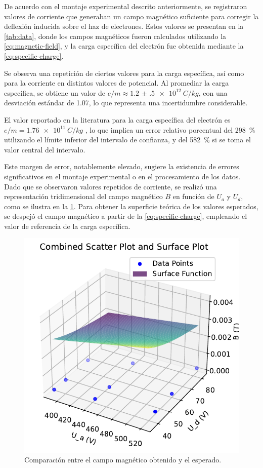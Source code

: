 De acuerdo con el montaje experimental descrito anteriormente,
se registraron valores de corriente que generaban un campo magnético suficiente
para corregir la deflexión inducida sobre el haz de electrones.
Estos valores se presentan en la \cref{tab:data}, donde los campos magnéticos
fueron calculados utilizando la \cref{eq:magnetic-field}, y la carga específica
del electrón fue obtenida mediante la \cref{eq:specific-charge}.



Se observa una repetición de ciertos valores para la carga específica,
así como para la corriente en distintos valores de potencial.
Al promediar la carga específica,
se obtiene un valor de \(e / m \approx \qty{1.2(5)e+12}{C \per kg}\),
con una desviación estándar de \num{1.07}, lo que representa una incertidumbre
considerable.

El valor reportado en la literatura para la carga específica del electrón es
\(e / m = \qty{1.76e11}{C \per kg}\) \cite{nist-2024}, lo que implica un error
relativo porcentual del \qty{298}{\percent} utilizando el límite inferior del
intervalo de confianza, y del \qty{582}{\percent} si se toma el valor central
del intervalo.

Este margen de error, notablemente elevado, sugiere la existencia de errores
significativos en el montaje experimental o en el procesamiento de los datos.
Dado que se observaron valores repetidos de corriente, se realizó una
representación tridimensional del campo magnético \(B\) en función de \(U_a\) y
\(U_d\), como se ilustra en la \cref{fig:magnetic-field}.
Para obtener la superficie teórica de los valores esperados, se despejó el campo
magnético a partir de la \cref{eq:specific-charge}, empleando el valor de
referencia de la carga específica.

\begin{figure}[htbp!]
  \centering
  \includegraphics[width=0.8\linewidth]{./images/Magnetic_Field.pdf}
  \caption{Comparación entre el campo magnético obtenido y el esperado.}
  \label{fig:magnetic-field}
\end{figure}

